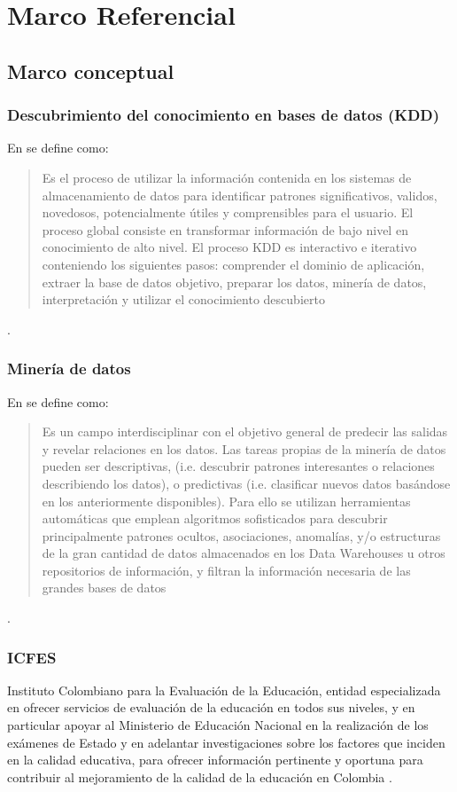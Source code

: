 \chapter{Marco Referencial}
\section{Marco conceptual}
\subsection{Descubrimiento del conocimiento en bases de datos (KDD)}
En \cite{key-60} se define como: \begin{quote} Es el proceso de utilizar la información contenida en los sistemas de almacenamiento de datos para identificar patrones significativos, validos, novedosos, potencialmente útiles y comprensibles para el usuario. El proceso global consiste en transformar información de bajo nivel en conocimiento de alto nivel. El proceso KDD es interactivo e iterativo conteniendo los siguientes pasos: comprender el dominio de aplicación, extraer la base de datos objetivo, preparar los datos, minería de datos, interpretación y utilizar el conocimiento descubierto \end{quote}.
\subsection{Minería de datos}
En \cite{key-60} se define como: \begin{quote} Es un campo interdisciplinar con el objetivo general de predecir las salidas y revelar relaciones en los datos. Las tareas propias de la minería de datos pueden ser descriptivas, (i.e. descubrir patrones interesantes o relaciones describiendo los datos), o predictivas (i.e. clasificar nuevos datos basándose en los anteriormente disponibles). Para ello se utilizan herramientas automáticas que emplean algoritmos sofisticados para descubrir principalmente patrones ocultos, asociaciones, anomalías, y/o estructuras de la gran cantidad de datos almacenados en los Data Warehouses u otros repositorios de información, y filtran la información necesaria de las grandes bases de datos \end{quote}.
\subsection{ICFES}
Instituto Colombiano para la Evaluación de la Educación, entidad especializada en ofrecer servicios de evaluación de la educación en todos sus niveles, y en particular apoyar al Ministerio de Educación Nacional en la realización de los exámenes de Estado y en adelantar investigaciones sobre los factores que inciden en la calidad educativa, para ofrecer información pertinente y oportuna para contribuir al mejoramiento de la calidad de la educación en Colombia \cite{key-80}.
